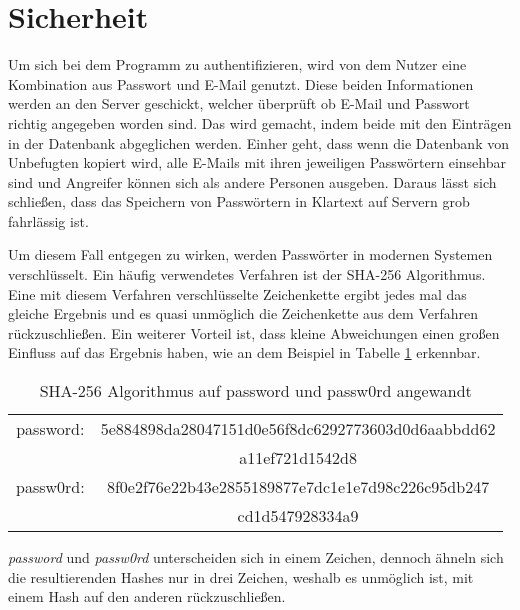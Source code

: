 


\section{Sicherheit}
\label{section:sicherheit}

Um sich bei dem Programm zu authentifizieren, wird von dem Nutzer eine Kombination aus Passwort und E-Mail genutzt. Diese beiden Informationen werden an den Server geschickt, welcher überprüft ob E-Mail und Passwort richtig angegeben worden sind. Das wird gemacht, indem beide mit den Einträgen in der Datenbank abgeglichen werden. Einher geht, dass wenn die Datenbank von Unbefugten kopiert wird, alle E-Mails mit ihren jeweiligen Passwörtern einsehbar sind und Angreifer können sich als andere Personen ausgeben. Daraus lässt sich schließen, dass das Speichern von Passwörtern in Klartext auf Servern grob fahrlässig ist.

Um diesem Fall entgegen zu wirken, werden Passwörter in modernen Systemen verschlüsselt. Ein häufig verwendetes Verfahren ist der SHA-256 Algorithmus. Eine mit diesem Verfahren verschlüsselte Zeichenkette ergibt jedes mal das gleiche Ergebnis und es quasi unmöglich die Zeichenkette aus dem Verfahren rückzuschließen. Ein weiterer Vorteil ist, dass kleine Abweichungen einen großen Einfluss auf das Ergebnis haben, wie an dem Beispiel in Tabelle \ref{tab:sha-algorihtm} erkennbar.

\begin{table}[H]
    \centering
    \begin{tabular}{cc}
        \hline
        password: & 5e884898da28047151d0e56f8dc6292773603d0d6aabbdd62 \\ & a11ef721d1542d8 \\
        \hline
        passw0rd: & 8f0e2f76e22b43e2855189877e7dc1e1e7d98c226c95db247 \\
        & cd1d547928334a9 \\
        \hline
    \end{tabular}
    \caption{SHA-256 Algorithmus auf password und passw0rd angewandt}
    \label{tab:sha-algorihtm}
\end{table}

\textit{password} und \textit{passw0rd} unterscheiden sich in einem Zeichen, dennoch ähneln sich die resultierenden Hashes nur in drei Zeichen, weshalb es unmöglich ist, mit einem Hash auf den anderen rückzuschließen.

